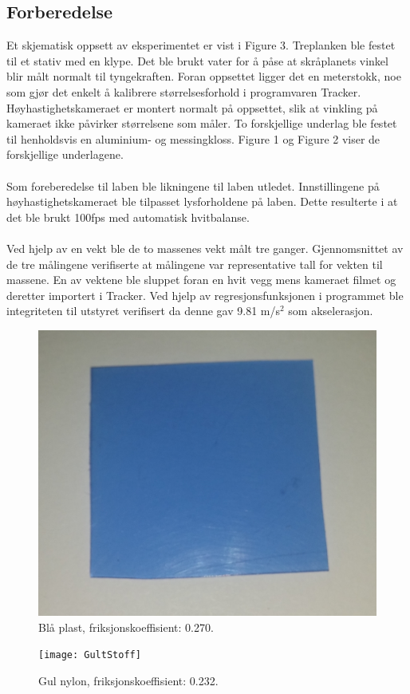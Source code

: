 \documentclass[10pt,a4paper]{report}
\begin{document}
\subsection*{Forberedelse}
Et skjematisk oppsett av eksperimentet er vist i Figure 3. Treplanken ble festet til et stativ med en klype. Det ble brukt vater for å påse at skråplanets vinkel blir målt normalt til tyngekraften. Foran oppsettet ligger det en meterstokk, noe som gjør det enkelt å kalibrere størrelsesforhold i programvaren Tracker. Høyhastighetskameraet er montert normalt på oppsettet, slik at vinkling på kameraet ikke påvirker størrelsene som måler. To forskjellige underlag ble festet til henholdsvis en aluminium- og messingkloss. Figure 1 og Figure 2 viser de forskjellige underlagene.\\
\\Som foreberedelse til laben ble likningene til laben utledet. Innstillingene på høyhastighetskameraet ble tilpasset lysforholdene på laben. Dette resulterte i at det ble brukt 100fps med automatisk hvitbalanse.\\
\\Ved hjelp av en vekt ble de to massenes vekt målt tre ganger. Gjennomsnittet av de tre målingene verifiserte at målingene var representative tall for vekten til massene. En av vektene ble sluppet foran en hvit vegg mens kameraet filmet og deretter importert i Tracker. Ved hjelp av regresjonsfunksjonen i programmet ble integriteten til utstyret verifisert da denne gav 9.81 m/s$^2$ som akselerasjon.

\begin{figure}
    \centerline{\includegraphics[scale=0.05]{BlaaPlast}}
    \caption{Blå plast, friksjonskoeffisient: 0.270.}
    \label{fig:1}
\end{figure}
\begin{figure}
    \centerline{\texttt{[image: GultStoff]}}
    \caption{Gul nylon, friksjonskoeffisient: 0.232.}
    \label{fig:2}
\end{figure}
\end{document}
